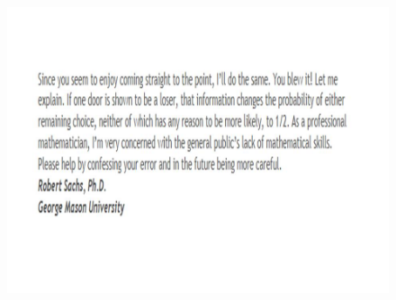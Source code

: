 \documentclass{beamer}
\begin{document}
\begin{frame}
	\begin{figure}

		\includegraphics[width=1.20\linewidth]{MontyHall/Slide8}
		
	\end{figure}
	
\end{frame}
\end{document}
